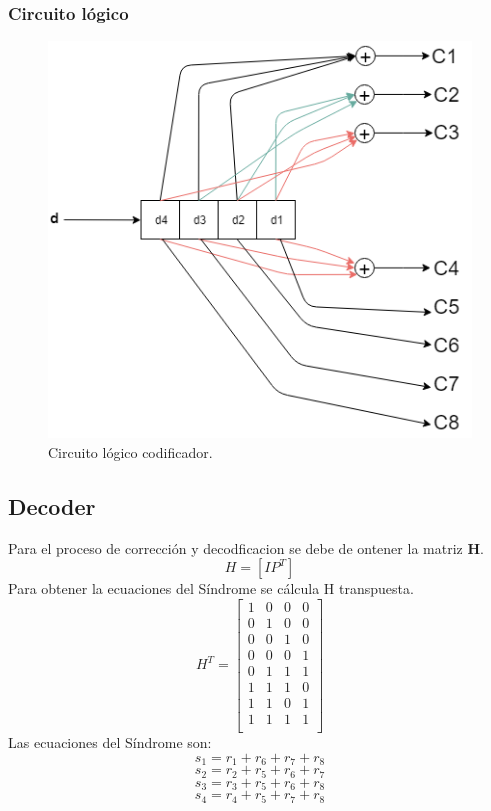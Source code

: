 \documentclass[12pt,letterpaper]{article}
\begin{document}
\subsubsection{Circuito lógico}
\begin{figure}[ht]
    \centering
    \includegraphics[width=.8\textwidth]{ccode.png}
    \caption{Circuito lógico codificador.}
\end{figure}

\newpage
\subsection{Decoder}
Para el proceso de corrección y decodficacion se debe de ontener la matriz \textbf{H}.
\begin{equation}
    H=[I P^T]
\end{equation}
Para obtener la ecuaciones del Síndrome se cálcula H transpuesta.
\[
H^T
=
\begin{bmatrix} 
    1 & 0 & 0 & 0 \\
    0 & 1 & 0 & 0 \\
    0 & 0 & 1 & 0 \\
    0 & 0 & 0 & 1 \\
    0 & 1 & 1 & 1 \\
    1 & 1 & 1 & 0 \\
    1 & 1 & 0 & 1 \\
    1 & 1 & 1 & 1 \\
\end{bmatrix}
\]
Las ecuaciones del Síndrome son:
$$s_1=r_1+r_6+r_7+r_8$$
$$s_2=r_2+r_5+r_6+r_7$$
$$s_3=r_3+r_5+r_6+r_8$$
$$s_4=r_4+r_5+r_7+r_8$$
\end{document}

